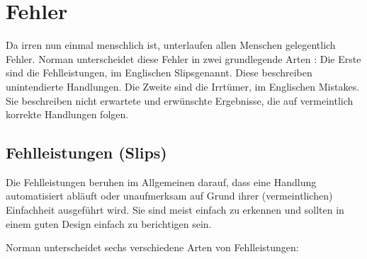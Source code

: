 \documentclass[parskip,headsepline, headtopline, %
footsepline, oneside, 12pt, headings=small]{scrreprt}
\begin{document}
\section{Fehler}

Da irren nun einmal menschlich ist, unterlaufen allen Menschen gelegentlich Fehler. Norman unterscheidet diese Fehler in zwei grundlegende Arten \cite[S. 105]{don}: Die Erste sind die Fehlleistungen, im Englischen \glqq Slips\grqq  genannt. Diese beschreiben unintendierte Handlungen. Die Zweite sind die Irrtümer, im Englischen \glqq Mistakes\grqq. Sie beschreiben nicht erwartete und erwünschte Ergebnisse, die auf vermeintlich korrekte Handlungen folgen.

\subsection{Fehlleistungen (Slips)}

Die Fehlleistungen beruhen im Allgemeinen darauf, dass eine Handlung automatisiert abläuft oder unaufmerksam auf Grund ihrer (vermeintlichen) Einfachheit ausgeführt wird. Sie sind meist einfach zu erkennen und sollten in einem guten Design einfach zu berichtigen sein.

Norman unterscheidet sechs verschiedene Arten von Fehlleistungen\cite[S. 107]{don}:
\end{document}
